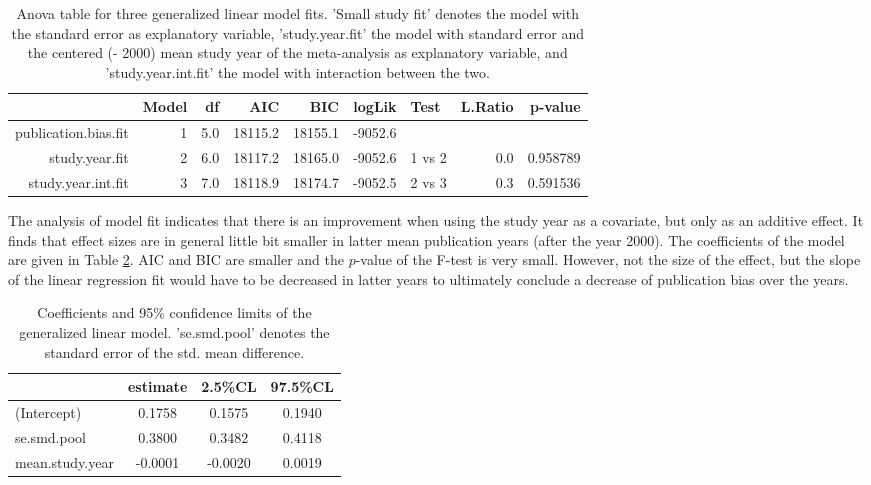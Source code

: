 \documentclass[11pt,a4paper,twoside]{book}\usepackage[]{graphicx}\usepackage[]{color}
\begin{document}
\begin{table}[ht]
\centering
\begingroup\scriptsize
\begin{tabular}{rrrrrrlrr}
  \hline
 & Model & df & AIC & BIC & logLik & Test & L.Ratio & p-value \\ 
  \hline
publication.bias.fit &  1 & 5.0 & 18115.2 & 18155.1 & -9052.6 &  &  &  \\ 
  study.year.fit &  2 & 6.0 & 18117.2 & 18165.0 & -9052.6 & 1 vs 2 & 0.0 & 0.958789 \\ 
  study.year.int.fit &  3 & 7.0 & 18118.9 & 18174.7 & -9052.5 & 2 vs 3 & 0.3 & 0.591536 \\ 
   \hline
\end{tabular}
\endgroup
\caption{Anova table for three generalized linear model fits. 'Small study fit' denotes the model with the standard error as explanatory variable, 'study.year.fit' the model with standard error and the centered (- 2000) mean study year of the meta-analysis as explanatory variable, and 'study.year.int.fit' the model with interaction between the two.} 
\label{anova.lme}
\end{table}


The analysis of model fit indicates that there is an improvement when using the study year as a covariate, but only as an additive effect. It finds that effect sizes are in general little bit smaller in latter mean publication years (after the year 2000). The coefficients of the model are given in Table \ref{coefficients.study.year.fit}. AIC and BIC are smaller and the $p$-value of the F-test is very small. However, not the size of the effect, but the slope of the linear regression fit would have to be decreased in latter years to ultimately conclude a decrease of publication bias over the years. 


\begin{table}[ht]
\centering
\begingroup\scriptsize
\begin{tabular}{lccc}
  \hline
 & estimate & 2.5\%CL & 97.5\%CL \\ 
  \hline
(Intercept) & 0.1758 & 0.1575 & 0.1940 \\ 
  se.smd.pool & 0.3800 & 0.3482 & 0.4118 \\ 
  mean.study.year & -0.0001 & -0.0020 & 0.0019 \\ 
   \hline
\end{tabular}
\endgroup
\caption{Coefficients and 95\% confidence limits of the generalized linear model. 'se.smd.pool' denotes the standard error of the std. mean difference.} 
\label{coefficients.study.year.fit}
\end{table}
\end{document}
